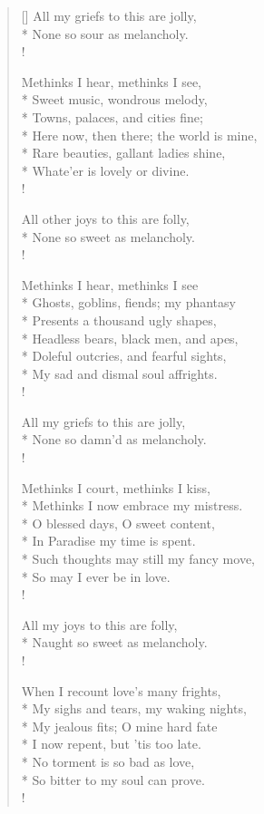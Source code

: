 \begin{verse}[\versewidth]
All my griefs to this are jolly,\\*
None so sour as melancholy.\\!

Methinks I hear, methinks I see,\\*
Sweet music, wondrous melody,\\*
Towns, palaces, and cities fine;\\*
Here now, then there; the world is mine,\\*
Rare beauties, gallant ladies shine,\\*
Whate'er is lovely or divine.\\!

All other joys to this are folly,\\*
None so sweet as melancholy.\\!

Methinks I hear, methinks I see\\*
Ghosts, goblins, fiends; my phantasy\\*
Presents a thousand ugly shapes,\\*
Headless bears, black men, and apes,\\*
Doleful outcries, and fearful sights,\\*
My sad and dismal soul affrights.\\!

All my griefs to this are jolly,\\*
None so damn'd as melancholy.\\!

Methinks I court, methinks I kiss,\\*
Methinks I now embrace my mistress.\\*
O blessed days, O sweet content,\\*
In Paradise my time is spent.\\*
Such thoughts may still my fancy move,\\*
So may I ever be in love.\\!

All my joys to this are folly,\\*
Naught so sweet as melancholy.\\!

When I recount love's many frights,\\*
My sighs and tears, my waking nights,\\*
My jealous fits; O mine hard fate\\*
I now repent, but 'tis too late.\\*
No torment is so bad as love,\\*
So bitter to my soul can prove.\\!


\end{verse}
